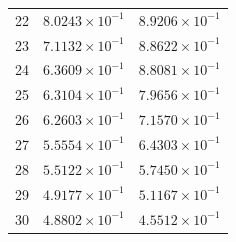 \begin{table}[H]
\begin{tabular}{@{}rrr@{}}
22 & $8.0243\times10^{-1}$ & $8.9206\times10^{-1}$\\
23 & $7.1132\times10^{-1}$ & $8.8622\times10^{-1}$\\
24 & $6.3609\times10^{-1}$ & $8.8081\times10^{-1}$\\
25 & $6.3104\times10^{-1}$ & $7.9656\times10^{-1}$\\
26 & $6.2603\times10^{-1}$ & $7.1570\times10^{-1}$\\
27 & $5.5554\times10^{-1}$ & $6.4303\times10^{-1}$\\
28 & $5.5122\times10^{-1}$ & $5.7450\times10^{-1}$\\
29 & $4.9177\times10^{-1}$ & $5.1167\times10^{-1}$\\
30 & $4.8802\times10^{-1}$ & $4.5512\times10^{-1}$\\
\bottomrule
\end{tabular}
\end{table}

